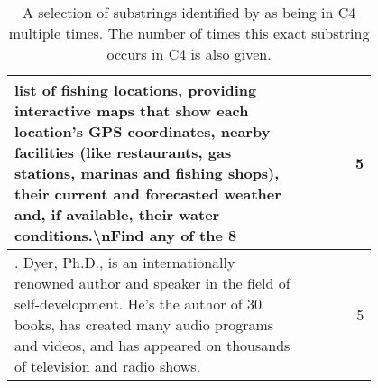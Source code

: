 \begin{table*}[h]
\begin{tabular}{p{0.8\linewidth}|r}
     \hline
     list of fishing locations, providing interactive maps that show each location's GPS coordinates, nearby facilities (like restaurants, gas stations, marinas and fishing shops), their current and forecasted weather and, if available, their water conditions.\textbackslash{}nFind any of the 8 &                     5  \\
     \hline
    . Dyer, Ph.D., is an internationally renowned author and speaker in the field of self-development. He's the author of 30 books, has created many audio programs and videos, and has appeared on thousands of television and radio shows. &                     5  \\
    \bottomrule
    \end{tabular}%
\caption{A selection of substrings identified by \Exact{} as being in C4 multiple times. The number of times this exact substring occurs in C4 is also given.}
  \label{tab:exact_substr_examples}%
\end{table*}%





